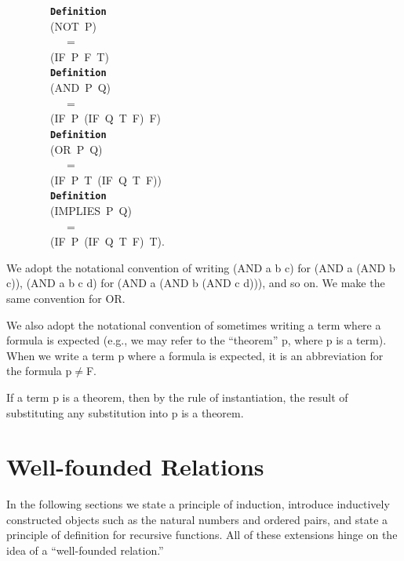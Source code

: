 \documentclass[11pt]{book}
\newenvironment{pubasis}{\begin{flushleft}\ttfamily\small}{\normalsize\rmfamily\end{flushleft}}
\newcommand{\axiomordefinition}[1]{\vspace{6pt}\texttt{\textbf{#1}}}
\newcommand{\pubdefaulttextsize}{\large}
\begin{document}
\begin{pubasis}
~~~~~~~~\axiomordefinition{Definition}\\
~~~~~~~~(NOT~P)\\
~~~~~~~~~~~=\\
~~~~~~~~(IF~P~F~T)\\

~~~~~~~~\axiomordefinition{Definition}\\
~~~~~~~~(AND~P~Q)\\
~~~~~~~~~~~=\\
~~~~~~~~(IF~P~(IF~Q~T~F)~F)\\

~~~~~~~~\axiomordefinition{Definition}\\
~~~~~~~~(OR~P~Q)\\
~~~~~~~~~~~=\\
~~~~~~~~(IF~P~T~(IF~Q~T~F))\\

~~~~~~~~\axiomordefinition{Definition}\\
~~~~~~~~(IMPLIES~P~Q)\\
~~~~~~~~~~~=\\
~~~~~~~~(IF~P~(IF~Q~T~F)~T).\\
\end{pubasis}
We adopt the notational convention of writing (AND a b c)
for (AND a (AND  b c)), (AND a b c d) for (AND a (AND b (AND c d))), and
so on.  We make the same convention for OR.

We also adopt
the notational convention of sometimes writing a term where a formula
is expected (e.g., we may refer to the ``theorem'' p, where p is a term).
When we write a term p where a formula is expected,
it is an abbreviation for the formula p$\neq$F.

If a term p is a theorem, then by the rule of instantiation,
the result of substituting any substitution into p is a theorem.

\nopagebreak\par\hrulefill\nopagebreak\par
\section{Well-founded Relations}
\pubdefaulttextsize
In the following sections we  state a principle of induction,
introduce inductively constructed objects such as the 
natural numbers and ordered pairs, and state a principle of definition
for recursive functions.  
All of these extensions hinge on the idea of a ``well-founded relation.''
\end{document}
